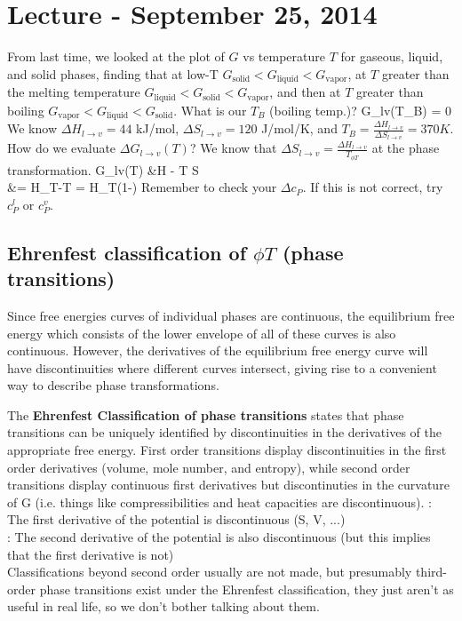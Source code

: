 \documentclass[12pt]{article}
\begin{document}
\section{Lecture - September 25, 2014}
From last time, we looked at the plot of $G$ vs temperature $T$ for gaseous, liquid, and solid phases, finding that at low-T $G_\text{solid} < G_\text{liquid} <  G_\text{vapor}$, at $T$ greater than the melting temperature $G_\text{liquid} < G_\text{solid} <  G_\text{vapor}$, and then at $T$ greater than boiling $G_\text{vapor} < G_\text{liquid} <  G_\text{solid}$.  What is our $T_B$ (boiling temp.)?
\eqs
\Delta G_{l\rightarrow v}(T_B) = 0
\eqe
We know $\Delta H_{l\rightarrow v} = 44$ kJ/mol, $\Delta S_{l\rightarrow v} = 120$ J/mol/K, and $T_B = \frac{\Delta H_{l\rightarrow v}}{\Delta S_{l\rightarrow v}} = 370 K$.  How do we evaluate $\Delta G_{l\rightarrow v}(T)$?  We know that $\Delta S_{l\rightarrow v} = \frac{\Delta H_{l\rightarrow v}}{T_{\phi T}}$ at the phase transformation.
\eqs
\Delta G_{l\rightarrow v}(T) &\approx \Delta H - T \Delta S\\
&= \Delta H_{\phi T}-T = \Delta H_{\phi T}(1-)
\eqe
Remember to check your $\Delta c_P$.  If this is not correct, try $c_P^{l}$ or $c_P^{v}$.\\

\subsection{Ehrenfest classification of $\phi T$ (phase transitions)}
Since free energies curves of individual phases are continuous, the equilibrium free energy which consists of the lower envelope of all of these curves is also continuous. However, the derivatives of the equilibrium free energy curve will have discontinuities where different curves intersect, giving rise to a convenient way to describe phase transformations. 

The \textbf{Ehrenfest Classification of phase transitions} states that phase transitions can be uniquely identified by discontinuities in the derivatives of the appropriate free energy. First order transitions display discontinuities in the first order derivatives (volume, mole number, and entropy), while second order transitions display continuous first derivatives but discontinuties in the curvature of G (i.e. things like compressibilities and heat capacities are discontinuous).
:  The first derivative of the potential is discontinuous (S, V, ...)\\
:  The second derivative of the potential is also discontinuous (but this implies that the first derivative is not)\\
Classifications beyond second order usually are not made, but presumably third-order phase transitions exist under the Ehrenfest classification, they just aren't as useful in real life, so we don't bother talking about them.
\end{document}
